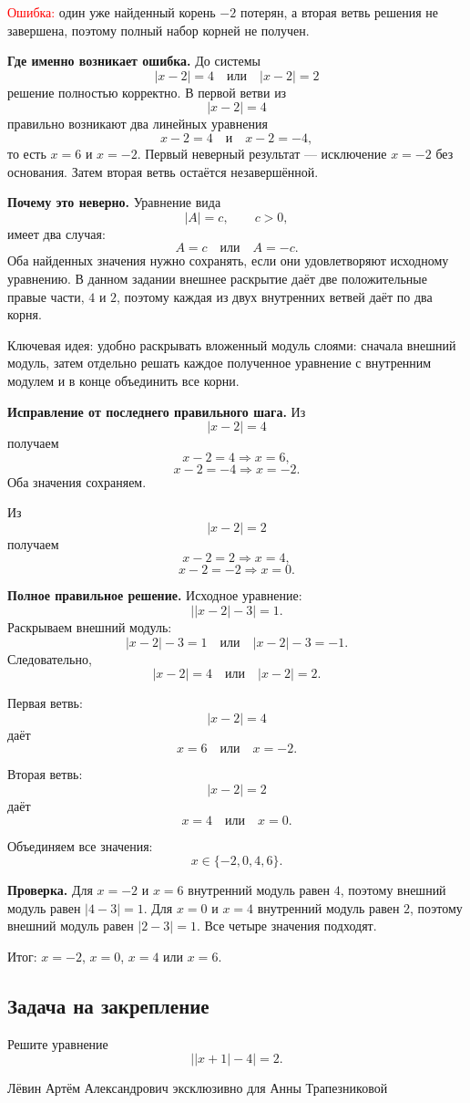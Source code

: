 \documentclass[12pt,a4paper]{article}
\newcommand{\err}{\textcolor{red}{Ошибка:}}
\newcommand{\idea}{\textcolor{blue!60!black}{Ключевая идея:}}
\newcommand{\result}{\textcolor{teal!60!black}{Итог:}}
\begin{document}
\err{} один уже найденный корень $-2$ потерян, а вторая ветвь решения не завершена, поэтому полный набор корней не получен.

\textbf{Где именно возникает ошибка.} До системы
\[
|x-2|=4
\quad\text{или}\quad
|x-2|=2
\]
решение полностью корректно. В первой ветви из
\[
|x-2|=4
\]
правильно возникают два линейных уравнения
\[
x-2=4
\quad\text{и}\quad
x-2=-4,
\]
то есть $x=6$ и $x=-2$. Первый неверный результат --- исключение $x=-2$ без основания. Затем вторая ветвь остаётся незавершённой.

\textbf{Почему это неверно.} Уравнение вида
\[
|A|=c,
\qquad c>0,
\]
имеет два случая:
\[
A=c
\quad\text{или}\quad
A=-c.
\]
Оба найденных значения нужно сохранять, если они удовлетворяют исходному уравнению. В данном задании внешнее раскрытие даёт две положительные правые части, $4$ и $2$, поэтому каждая из двух внутренних ветвей даёт по два корня.

\idea{} удобно раскрывать вложенный модуль слоями: сначала внешний модуль, затем отдельно решать каждое полученное уравнение с внутренним модулем и в конце объединить все корни.

\textbf{Исправление от последнего правильного шага.} Из
\[
|x-2|=4
\]
получаем
\[
x-2=4\Rightarrow x=6,
\]
\[
x-2=-4\Rightarrow x=-2.
\]
Оба значения сохраняем.

Из
\[
|x-2|=2
\]
получаем
\[
x-2=2\Rightarrow x=4,
\]
\[
x-2=-2\Rightarrow x=0.
\]

\textbf{Полное правильное решение.} Исходное уравнение:
\[
\bigl||x-2|-3\bigr|=1.
\]
Раскрываем внешний модуль:
\[
|x-2|-3=1
\quad\text{или}\quad
|x-2|-3=-1.
\]
Следовательно,
\[
|x-2|=4
\quad\text{или}\quad
|x-2|=2.
\]

Первая ветвь:
\[
|x-2|=4
\]
даёт
\[
x=6
\quad\text{или}\quad
x=-2.
\]

Вторая ветвь:
\[
|x-2|=2
\]
даёт
\[
x=4
\quad\text{или}\quad
x=0.
\]

Объединяем все значения:
\[
x\in\{-2,0,4,6\}.
\]

\textbf{Проверка.} Для $x=-2$ и $x=6$ внутренний модуль равен $4$, поэтому внешний модуль равен $|4-3|=1$. Для $x=0$ и $x=4$ внутренний модуль равен $2$, поэтому внешний модуль равен $|2-3|=1$. Все четыре значения подходят.

\result{} $x=-2$, $x=0$, $x=4$ или $x=6$.

\subsection*{Задача на закрепление}
Решите уравнение
\[
\bigl||x+1|-4\bigr|=2.
\]

\vfill
\begin{center}
\small Лёвин Артём Александрович эксклюзивно для Анны Трапезниковой
\end{center}
\end{document}
